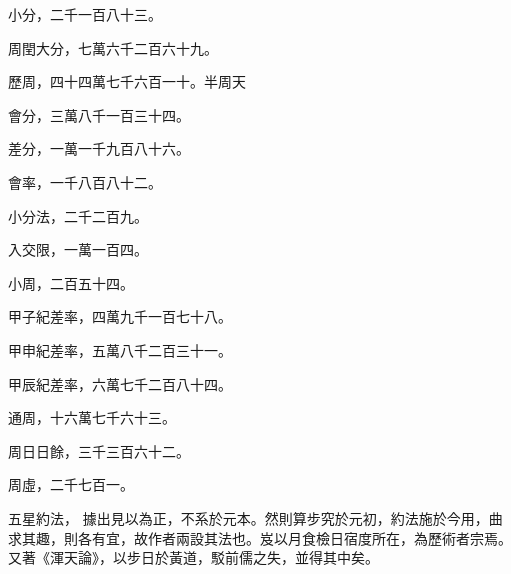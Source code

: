 \begin{pinyinscope}
 小分，二千一百八十三。



 周閏大分，七萬六千二百六十九。



 歷周，四十四萬七千六百一十。半周天



 會分，三萬八千一百三十四。



 差分，一萬一千九百八十六。



 會率，一千八百八十二。



 小分法，二千二百九。



 入交限，一萬一百四。



 小周，二百五十四。



 甲子紀差率，四萬九千一百七十八。



 甲申紀差率，五萬八千二百三十一。



 甲辰紀差率，六萬七千二百八十四。



 通周，十六萬七千六十三。



 周日日餘，三千三百六十二。



 周虛，二千七百一。



 五星約法，
 據出見以為正，不系於元本。然則算步究於元初，約法施於今用，曲求其趣，則各有宜，故作者兩設其法也。岌以月食檢日宿度所在，為歷術者宗焉。又著《渾天論》，以步日於黃道，駁前儒之失，並得其中矣。



\end{pinyinscope}